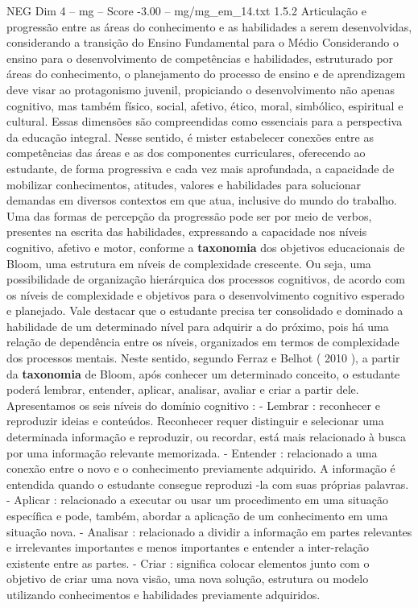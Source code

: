 \begin{textsample}{NEG Dim 4 – mg – Score -3.00 – mg/mg\_em\_14.txt}  \label{ex:f4_neg_091}
1.5.2 Articulação e progressão entre as áreas do conhecimento e as habilidades a serem desenvolvidas, considerando a transição do Ensino Fundamental para o Médio Considerando o ensino para o desenvolvimento de competências e habilidades, estruturado por áreas do conhecimento, o planejamento do processo de ensino e de aprendizagem deve visar ao protagonismo juvenil, propiciando o desenvolvimento não apenas cognitivo, mas também físico, social, afetivo, ético, moral, simbólico, espiritual e cultural.
Essas dimensões são compreendidas como essenciais para a perspectiva da educação integral.
Nesse sentido, é mister estabelecer conexões entre as competências das áreas e as dos componentes curriculares, oferecendo ao estudante, de forma progressiva e cada vez mais aprofundada, a capacidade de mobilizar conhecimentos, atitudes, valores e habilidades para solucionar demandas em diversos contextos em que atua, inclusive do mundo do trabalho.
Uma das formas de percepção da progressão pode ser por meio de verbos, presentes na escrita das habilidades, expressando a capacidade nos níveis cognitivo, afetivo e motor, conforme a \textbf{taxonomia} dos objetivos educacionais de Bloom, uma estrutura em níveis de complexidade crescente.
Ou seja, uma possibilidade de organização hierárquica dos processos cognitivos, de acordo com os níveis de complexidade e objetivos para o desenvolvimento cognitivo esperado e planejado.
Vale destacar que o estudante precisa ter consolidado e dominado a habilidade de um determinado nível para adquirir a do próximo, pois há uma relação de dependência entre os níveis, organizados em termos de complexidade dos processos mentais.
Neste sentido, segundo Ferraz e Belhot ( 2010 ), a partir da \textbf{taxonomia} de Bloom, após conhecer um determinado conceito, o estudante poderá lembrar, entender, aplicar, analisar, avaliar e criar a partir dele.
Apresentamos os seis níveis do domínio cognitivo : - Lembrar : reconhecer e reproduzir ideias e conteúdos.
Reconhecer requer distinguir e selecionar uma determinada informação e reproduzir, ou recordar, está mais relacionado à busca por uma informação relevante memorizada. - Entender : relacionado a uma conexão entre o novo e o conhecimento previamente adquirido.
A informação é entendida quando o estudante consegue reproduzi -la com suas próprias palavras. - Aplicar : relacionado a executar ou usar um procedimento em uma situação específica e pode, também, abordar a aplicação de um conhecimento em uma situação nova. - Analisar : relacionado a dividir a informação em partes relevantes e irrelevantes importantes e menos importantes e entender a inter-relação existente entre as partes. - Criar : significa colocar elementos junto com o objetivo de criar uma nova visão, uma nova solução, estrutura ou modelo utilizando conhecimentos e habilidades previamente adquiridos.

\end{textsample}
